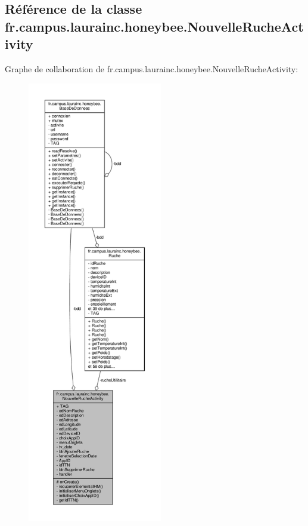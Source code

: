 \hypertarget{classfr_1_1campus_1_1laurainc_1_1honeybee_1_1_nouvelle_ruche_activity}{}\subsection{Référence de la classe fr.\+campus.\+laurainc.\+honeybee.\+Nouvelle\+Ruche\+Activity}
\label{classfr_1_1campus_1_1laurainc_1_1honeybee_1_1_nouvelle_ruche_activity}


Graphe de collaboration de fr.\+campus.\+laurainc.\+honeybee.\+Nouvelle\+Ruche\+Activity\+:\nopagebreak
\begin{figure}[H]
\begin{center}
\leavevmode
\includegraphics[height=550pt]{classfr_1_1campus_1_1laurainc_1_1honeybee_1_1_nouvelle_ruche_activity__coll__graph}
\end{center}
\end{figure}
